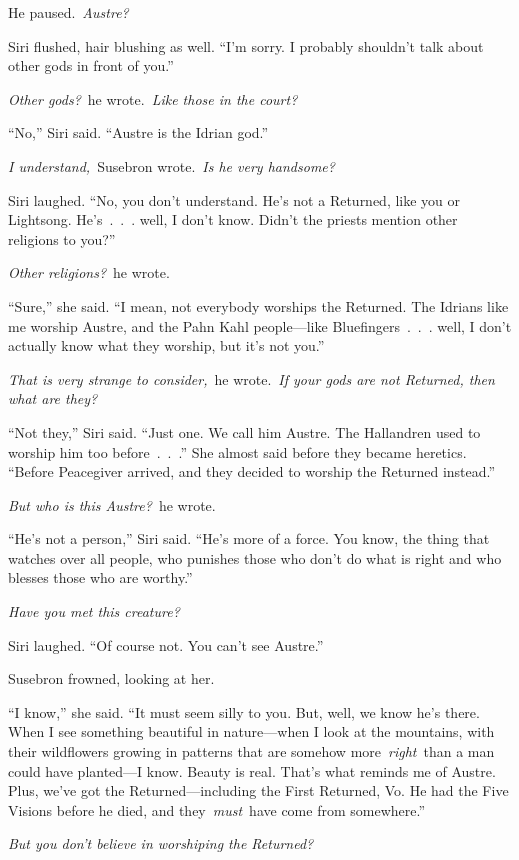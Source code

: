He paused.~\textit{Austre?}

Siri flushed, hair blushing as well. “I’m sorry. I probably shouldn’t talk about other gods in front of you.”

\textit{Other gods?}~he wrote.~\textit{Like those in the court?}

“No,” Siri said. “Austre is the Idrian god.”

\textit{I understand,}~Susebron wrote.~\textit{Is he very handsome?}

Siri laughed. “No, you don’t understand. He’s not a Returned, like you or Lightsong. He’s~.~.~. well, I don’t know. Didn’t the priests mention other religions to you?”

\textit{Other religions?}~he wrote.

“Sure,” she said. “I mean, not everybody worships the Returned. The Idrians like me worship Austre, and the Pahn Kahl people—like Bluefingers~.~.~. well, I don’t actually know what they worship, but it’s not you.”

\textit{That is very strange to consider,}~he wrote.~\textit{If your gods are not Returned, then what are they?}

“Not they,” Siri said. “Just one. We call him Austre. The Hallandren used to worship him too before~.~.~.” She almost said before they became heretics. “Before Peacegiver arrived, and they decided to worship the Returned instead.”

\textit{But who is this Austre?}~he wrote.

“He’s not a person,” Siri said. “He’s more of a force. You know, the thing that watches over all people, who punishes those who don’t do what is right and who blesses those who are worthy.”

\textit{Have you met this creature?}

Siri laughed. “Of course not. You can’t see Austre.”

Susebron frowned, looking at her.

“I know,” she said. “It must seem silly to you. But, well, we know he’s there. When I see something beautiful in nature—when I look at the mountains, with their wildflowers growing in patterns that are somehow more~\textit{right}~than a man could have planted—I know. Beauty is real. That’s what reminds me of Austre. Plus, we’ve got the Returned—including the First Returned, Vo. He had the Five Visions before he died, and they~\textit{must}~have come from somewhere.”

\textit{But you don’t believe in worshiping the Returned?}

